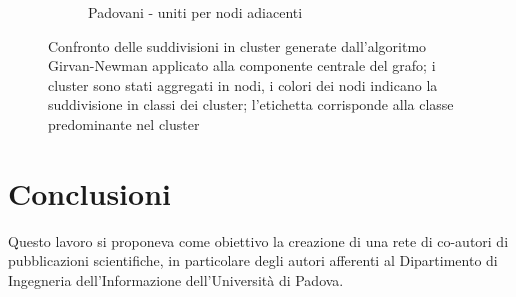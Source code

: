 \documentclass[12pt,a4paper,twoside]{report}
\begin{document}
\begin{figure}[ht]
\begin{subfigure}[b]{0.5\textwidth}
                \caption{Padovani - uniti per nodi adiacenti}
        \end{subfigure}%
    \caption{Confronto delle suddivisioni in cluster generate dall'algoritmo Girvan-Newman applicato
    alla componente centrale del grafo; i cluster sono stati aggregati in nodi, i colori dei nodi
    indicano la suddivisione in classi dei cluster; l'etichetta corrisponde alla classe
    predominante nel cluster}
    \label{fig:grafigirvanaggregati}
\end{figure}





\whitePage
\chapter{Conclusioni} \label{cap:conclusioni}

Questo lavoro si proponeva come obiettivo la creazione di una rete di co-autori di pubblicazioni
scientifiche, in particolare degli autori afferenti al Dipartimento di Ingegneria dell'Informazione
dell'Università di Padova.
\end{document}
